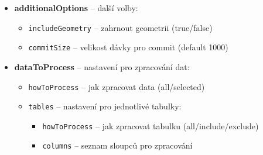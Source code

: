 \begin{itemize}
  \newpage

  \item \textbf{additionalOptions} -- další volby:
  \begin{itemize}
    \item \texttt{includeGeometry} -- zahrnout geometrii (true/false)
    \item \texttt{commitSize} -- velikost dávky pro commit (default 1000)
  \end{itemize}

  \item \textbf{dataToProcess} -- nastavení pro zpracování dat:
  \begin{itemize}
    \item \texttt{howToProcess} -- jak zpracovat data (all/selected)
    \item \texttt{tables} -- nastavení pro jednotlivé tabulky:
    \begin{itemize}
      \item \texttt{howToProcess} -- jak zpracovat tabulku (all/include/exclude)
      \item \texttt{columns} -- seznam sloupců pro zpracování
    \end{itemize}
  \end{itemize}
\end{itemize}

